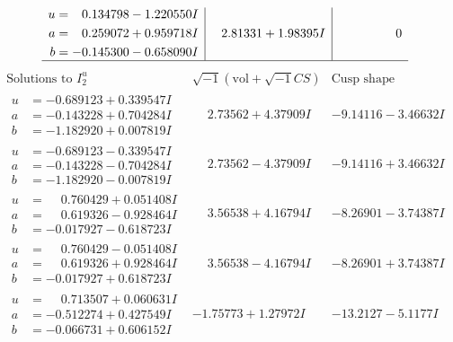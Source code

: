 \documentclass[1p]{elsarticle_modified}
\theoremstyle{definition}
\newcommand{\I}{\sqrt{-1}}
\begin{document}
$$\begin{array}{c|c|c}
\begin{aligned}
u &= \phantom{-}0.134798 - 1.220550 I \\
a &= \phantom{-}0.259072 + 0.959718 I \\
b &= -0.145300 - 0.658090 I\end{aligned}
 & \phantom{-}2.81331 + 1.98395 I & \phantom{-0.000000 } 0\\
 \hline 
 \end{array}$$\newpage$$\begin{array}{c|c|c}  
\text{Solutions to }I^u_{2}& \I (\text{vol} + \sqrt{-1}CS) & \text{Cusp shape}\\
 \hline 
\begin{aligned}
u &= -0.689123 + 0.339547 I \\
a &= -0.143228 + 0.704284 I \\
b &= -1.182920 + 0.007819 I\end{aligned}
 & \phantom{-}2.73562 + 4.37909 I & -9.14116 - 3.46632 I \\ \hline\begin{aligned}
u &= -0.689123 - 0.339547 I \\
a &= -0.143228 - 0.704284 I \\
b &= -1.182920 - 0.007819 I\end{aligned}
 & \phantom{-}2.73562 - 4.37909 I & -9.14116 + 3.46632 I \\ \hline\begin{aligned}
u &= \phantom{-}0.760429 + 0.051408 I \\
a &= \phantom{-}0.619326 - 0.928464 I \\
b &= -0.017927 - 0.618723 I\end{aligned}
 & \phantom{-}3.56538 + 4.16794 I & -8.26901 - 3.74387 I \\ \hline\begin{aligned}
u &= \phantom{-}0.760429 - 0.051408 I \\
a &= \phantom{-}0.619326 + 0.928464 I \\
b &= -0.017927 + 0.618723 I\end{aligned}
 & \phantom{-}3.56538 - 4.16794 I & -8.26901 + 3.74387 I \\ \hline\begin{aligned}
u &= \phantom{-}0.713507 + 0.060631 I \\
a &= -0.512274 + 0.427549 I \\
b &= -0.066731 + 0.606152 I\end{aligned}
 & -1.75773 + 1.27972 I & -13.2127 - 5.1177 I \\ \hline\begin{aligned}

\end{aligned}
\end{array}$$
\end{document}
